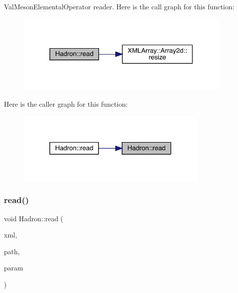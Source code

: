 Val\+Meson\+Elemental\+Operator reader. Here is the call graph for this function\+:\nopagebreak
\begin{figure}[H]
\begin{center}
\leavevmode
\includegraphics[width=297pt]{d1/daf/namespaceHadron_ae34c01603f5e8f9246374fddfaa8e062_cgraph}
\end{center}
\end{figure}
Here is the caller graph for this function\+:\nopagebreak
\begin{figure}[H]
\begin{center}
\leavevmode
\includegraphics[width=265pt]{d1/daf/namespaceHadron_ae34c01603f5e8f9246374fddfaa8e062_icgraph}
\end{center}
\end{figure}
\mbox{\label{namespaceHadron_adc5eb75838fc176e1641d6264c9a894d}} 
\subsubsection{\texorpdfstring{read()}{read()}\hspace{0.1cm}{\footnotesize\ttfamily [59/94]}}
{\footnotesize\ttfamily void Hadron\+::read (\begin{DoxyParamCaption}\item[{\mbox{\hyperlink{classADATXML_1_1XMLReader}{X\+M\+L\+Reader}} \&}]{xml,  }\item[{const std\+::string \&}]{path,  }\item[{\mbox{\hyperlink{structHadron_1_1KeyHadronSUNNPartIrrepOp__t_1_1CGPair__t}{Key\+Hadron\+S\+U\+N\+N\+Part\+Irrep\+Op\+\_\+t\+::\+C\+G\+Pair\+\_\+t}} \&}]{param }\end{DoxyParamCaption})}

